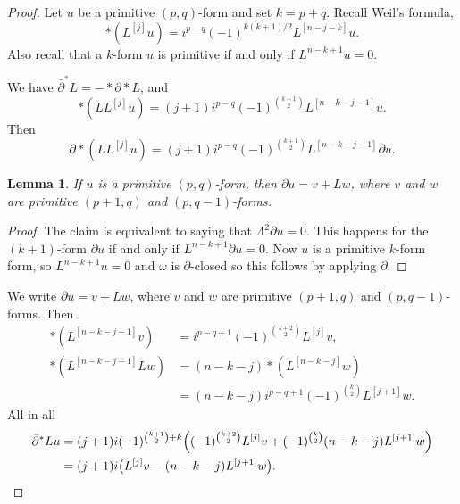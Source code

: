 \documentclass[11pt]{article}
\newtheorem{lemm}[theo]{Lemma}
\theoremstyle{definition}
\def\^#1{^{[#1]}}
\begin{document}
\begin{proof}
Let $u$ be a primitive $(p,q)$-form and set $k = p + q$.
Recall Weil's formula,
$$
*(L^{[j]} u)
= i^{p-q} (-1)^{k(k+1)/2} L^{[n-j-k]} u.
$$
Also recall that a $k$-form $u$ is primitive if and only if $L^{n-k+1} u = 0$.


We have
$\bar\partial^* L = - * \partial * L$, and
$$
*(L L\^{j}u)
= (j+1) i^{p-q} (-1)^{\binom{k+1}2} L\^{n-k-j-1} u.
$$
Then
$$
\partial {*}(L L\^{j}u)
= (j+1) i^{p-q} (-1)^{\binom{k+1}2} L\^{n-k-j-1} \partial u .
$$

\begin{lemm}
If $u$ is a primitive $(p,q)$-form, then $\partial u = v + L w$, where $v$ and
$w$ are primitive $(p+1,q)$ and $(p,q-1)$-forms.
\end{lemm}

\begin{proof}
The claim is equivalent to saying that $\Lambda^2 \partial u = 0$.
This happens for the $(k+1)$-form $\partial u$ if and only if $L^{n-k+1}
\partial u = 0$.
Now $u$ is a primitive $k$-form form, so $L^{n-k+1} u = 0$ and $\omega$ is
$\partial$-closed so this follows by applying $\partial$.
\end{proof}

We write $\partial u = v + L w$, where $v$ and $w$ are primitive $(p+1,q)$
and $(p,q-1)$-forms.
Then
\begin{align*}
*(L\^{n-k-j-1} v)
&= i^{p-q+1} (-1)^{\binom{k+2}2}
L\^{j} v,
\\
*(L\^{n-k-j-1} Lw)
&= (n-k-j) {*}(L\^{n-k-j} w)
\\
&= (n-k-j) i^{p-q+1} (-1)^{\binom{k}2}
L\^{j+1} w.
\end{align*}
All in all
\begin{align*}
\bar\partial^*L u
&=
(j+1) i (-1)^{\binom{k+1}2 + k}
\Bigl(
(-1)^{\binom{k+2}{2}} L\^{j} v
+ (-1)^{\binom{k}{2}} (n-k-j) L\^{j+1} w
\Bigr)
\\
&=
(j+1) i
\bigl(
L\^{j} v - (n-k-j) L\^{j+1} w
\bigr).
\end{align*}


\end{proof}
\end{document}
